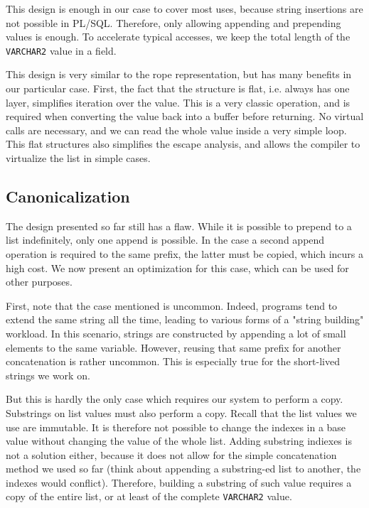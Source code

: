 \documentclass[twoside,11pt,a4paper]{article}
\newcommand{\pls}[1]{\small\texttt{#1}\normalsize}
\newcommand{\plstype}[1]{\pls{#1}}
\newcommand{\varchar}{\plstype{VARCHAR2}}
\begin{document}
This design is enough in our case to cover most uses, because string insertions are not possible in PL/SQL. Therefore, only allowing appending and prepending values is enough. To accelerate typical accesses, we keep the total length of the \varchar{} value in a field.

This design is very similar to the rope representation, but has many benefits in our particular case. First, the fact that the structure is flat, i.e. always has one layer, simplifies iteration over the value. This is a very classic operation, and is required when converting the value back into a buffer before returning. No virtual calls are necessary, and we can read the whole value inside a very simple loop. This flat structures also simplifies the escape analysis, and allows the compiler to virtualize the list in simple cases.

\subsection{Canonicalization}


The design presented so far still has a flaw. While it is possible to prepend to a list indefinitely, only one append is possible. In the case a second append operation is required to the same prefix, the latter must be copied, which incurs a high cost. We now present an optimization for this case, which can be used for other purposes.

First, note that the case mentioned is uncommon. Indeed, programs tend to extend the same string all the time, leading to various forms of a "string building" workload. In this scenario, strings are constructed by appending a lot of small elements to the same variable. However, reusing that same prefix for another concatenation is rather uncommon. This is especially true for the short-lived strings we work on.

But this is hardly the only case which requires our system to perform a copy. Substrings on list values must also perform a copy. Recall that the list values we use are immutable. It is therefore not possible to change the indexes in a base value without changing the value of the whole list. Adding substring indiexes is not a solution either, because it does not allow for the simple concatenation method we used so far (think about appending a substring-ed list to another, the indexes would conflict). Therefore, building a substring of such value requires a copy of the entire list, or at least of the complete \varchar{} value.
\end{document}

